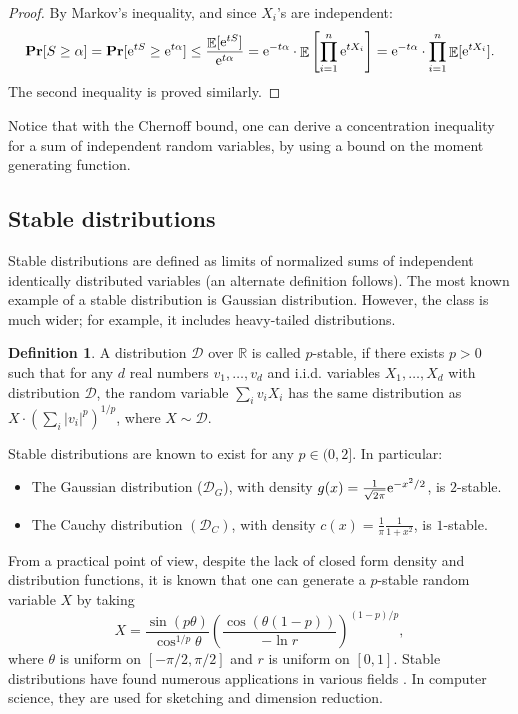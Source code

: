 \documentclass[10pt,a4paper,twoside]{book}
\newcommand{\cauchy}{\mathcal{D}_C}
\newcommand{\ex}{{\rm e}}
\DeclareMathOperator*{\prob}{\mathbf{Pr}}
\DeclareMathOperator*{\EE}{\mathbb{E}}
\theoremstyle{definition}
\newtheorem{definition}{Definition}[chapter]
\theoremstyle{remark}
\begin{document}
\begin{proof}
By Markov's inequality, and since $X_i$'s are independent:
\begin{align*}
    \prob[S \geq \alpha] = \prob[\ex^{tS} \geq \ex^{t\alpha}] \leq \frac{\EE[\ex^{tS}]}{\ex^{t\alpha}} = \ex^{-t\alpha} \cdot \EE \left[ \prod_{i=1}^n \ex^{tX_i} \right] = \ex^{-t\alpha} \cdot \prod_{i=1}^n \EE[\ex^{tX_i}].
\end{align*}
The second inequality is proved similarly.
\end{proof}

Notice that with the Chernoff bound, one can derive a concentration inequality for a sum of independent random variables, by using a bound on the moment generating function.

\subsection*{Stable distributions}
Stable distributions \cite{Zol86} are defined as limits of normalized sums of independent identically distributed variables (an alternate definition follows). The most known example of a stable distribution is Gaussian distribution. However, the class is much wider; for example, it includes heavy-tailed distributions.

\begin{definition}
A distribution $\mathcal{D}$ over $\mathbb{R}$ is called $p$-stable, if there exists $p > 0$ such that for any $d$ real numbers $v_1, \ldots, v_d$ and i.i.d. variables $X_1, \ldots, X_d$ with distribution $\mathcal{D}$, the random variable $\sum_i v_i X_i$ has the same distribution as $X \cdot (\sum_i |v_i|^{p})^{1/p}$, where $X \sim \mathcal{D}$.
\end{definition}
Stable distributions are known to exist for any $p \in (0,2]$. In particular:
\begin{itemize}
    \item The Gaussian distribution ($\mathcal{D}_G$), with density $g(x) = \frac{1}{\sqrt{2 \pi}} \ex^{-x^2/2}$, is $2$-stable.
    \item The Cauchy distribution $(\cauchy)$, with density $c(x) = \frac{1}{\pi} \frac{1}{1 + x^2}$, is $1$-stable.
\end{itemize}

From a practical point of view, despite the lack of closed form density and distribution functions, it is known \cite{CMS76} that one can generate a $p$-stable random variable $X$ by taking
\[ X = \frac{\sin{(p \theta)}}{\cos^{1/p}{\theta}} \left( \frac{\cos{(\theta(1-p))}}{-\ln{r}} \right)^{(1-p)/p},\]
where $\theta$ is uniform on $[-\pi/2, \pi/2]$ and $r$ is uniform on $[0,1]$. Stable distributions have found numerous applications in various fields \cite{Nol18}. In computer science, they are used for sketching and dimension reduction.
\end{document}
